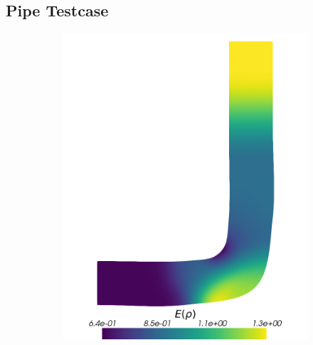 \subsection{Pipe Testcase}
\begin{figure}[H]
	\centering
	\begin{subfigure}{0.5\linewidth}
		\centering
		\includegraphics[scale=0.2]{figs/pipe/pipe_sc_ref_n50_E(rho).png}
		\label{fig:referenceSolutionsPipe1}
	\end{subfigure}%
	\begin{subfigure}{0.5\linewidth}
		\centering

\end{subfigure}
\end{figure}
